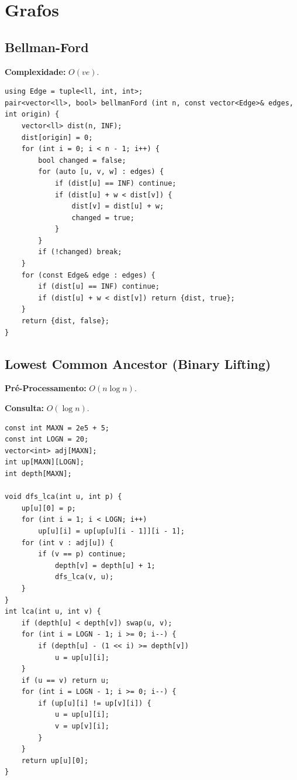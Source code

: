 \section{Grafos}



\subsection{Bellman-Ford}

\textbf{Complexidade:} $O(v e)$.

\begin{lstlisting}
using Edge = tuple<ll, int, int>;
pair<vector<ll>, bool> bellmanFord (int n, const vector<Edge>& edges, int origin) {
    vector<ll> dist(n, INF);
    dist[origin] = 0;
    for (int i = 0; i < n - 1; i++) {
        bool changed = false;
        for (auto [u, v, w] : edges) {
            if (dist[u] == INF) continue;
            if (dist[u] + w < dist[v]) {
                dist[v] = dist[u] + w;
                changed = true;
            }
        }
        if (!changed) break;
    }
    for (const Edge& edge : edges) {
        if (dist[u] == INF) continue;
        if (dist[u] + w < dist[v]) return {dist, true};
    }
    return {dist, false};
}
\end{lstlisting}


\subsection{Lowest Common Ancestor (Binary Lifting)}

\textbf{Pré-Processamento:} $O(n \log n)$.

\textbf{Consulta:} $O(\log n)$.

\begin{lstlisting}
const int MAXN = 2e5 + 5;
const int LOGN = 20;
vector<int> adj[MAXN];
int up[MAXN][LOGN];
int depth[MAXN];

void dfs_lca(int u, int p) {
    up[u][0] = p;
    for (int i = 1; i < LOGN; i++)
        up[u][i] = up[up[u][i - 1]][i - 1];
    for (int v : adj[u]) {
        if (v == p) continue;
            depth[v] = depth[u] + 1;
            dfs_lca(v, u);
    }
}
int lca(int u, int v) {
    if (depth[u] < depth[v]) swap(u, v);
    for (int i = LOGN - 1; i >= 0; i--) {
        if (depth[u] - (1 << i) >= depth[v]) 
            u = up[u][i];
    }
    if (u == v) return u;
    for (int i = LOGN - 1; i >= 0; i--) {
        if (up[u][i] != up[v][i]) {
            u = up[u][i];
            v = up[v][i];
        }
    }
    return up[u][0];
}
\end{lstlisting}


